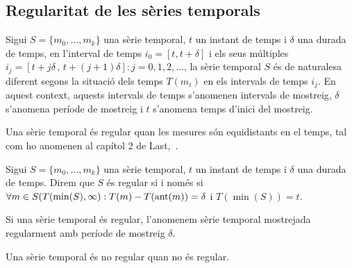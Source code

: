 \subsection{Regularitat de les sèries temporals} 

Sigui $S=\{m_0,\ldots,m_k\}$ una sèrie temporal, $t$ un instant de temps i $\delta$ una durada de temps, en l'interval de temps $i_0=[t,t+\delta]$ i els seus múltiples $i_j=[t+j\delta \,,\, t+(j+1)\delta]: j=0,1,2,\ldots$,  
la sèrie temporal $S$ és de naturalesa diferent segons la situació dels temps $T(m_i)$ en els intervals de temps $i_j$.
En aquest context, aquests intervals de temps s'anomenen intervals de mostreig, $\delta$ s'anomena període de mostreig i $t$ s'anomena temps d'inici del mostreig.

Una sèrie temporal és regular quan les mesures són equidistants en el temps, tal com ho anomenen al capítol 2 de Last,~\cite{last}.

\begin{definition}
  Sigui $S=\{m_0,\ldots,m_k\}$ una sèrie temporal, $t$ un instant de
  temps i $\delta$ una durada de temps. Direm que $S$ és regular si i
  només si $\forall m \in S(T(\min(S),\infty):T(m) - T(\operatorname*{ant}(m)) = \delta$ i
  $T(\min(S))=t$. 
\end{definition}

Si una sèrie temporal és regular, l'anomenem  sèrie temporal mostrejada
regularment amb període de mostreig $\delta$.


Una sèrie temporal és no regular quan no és regular. 




